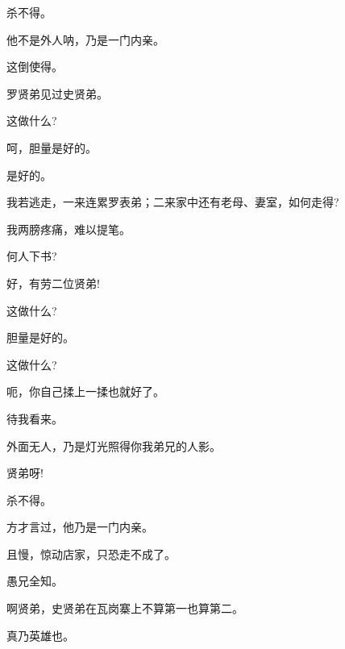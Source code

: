 {{杀不得。

他不是外人呐，乃是一门内亲。

这倒使得。

罗贤弟见过史贤弟。

这做什么?

呵，胆量是好的。

是好的。

我若逃走，一来连累罗表弟；二来家中还有老母、妻室，如何走得?

我两膀疼痛，难以提笔。

何人下书?

好，有劳二位贤弟!


这做什么?

胆量是好的。


这做什么?

呃，你自己揉上一揉也就好了。


待我看来。

外面无人，乃是灯光照得你我弟兄的人影。


贤弟呀!


杀不得。

方才言过，他乃是一门内亲。

且慢，惊动店家，只恐走不成了。

愚兄全知。

啊贤弟，史贤弟在瓦岗寨上不算第一也算第二。

真乃英雄也。


}}
